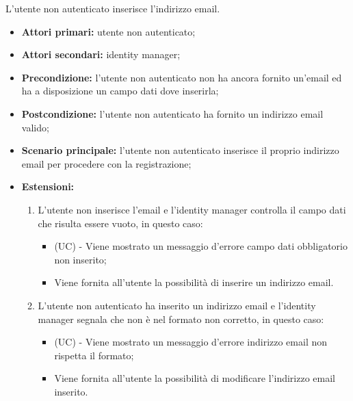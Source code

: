 L'utente non autenticato inserisce l'indirizzo email.
\begin{itemize}
	\item \textbf{Attori primari:} utente non autenticato;
	\item \textbf{Attori secondari:} identity manager;
	\item \textbf{Precondizione:} l'utente non autenticato non ha ancora fornito un'email ed ha a disposizione un campo dati dove inserirla;
	\item \textbf{Postcondizione:} l'utente non autenticato ha fornito un indirizzo email valido;
	\item \textbf{Scenario principale:} l'utente non autenticato inserisce il proprio indirizzo email per procedere con la registrazione;
	\item \textbf{Estensioni:}
	\begin{enumerate}[label=\lett]
		\item L'utente non inserisce l'email e l'identity manager controlla il campo dati che risulta essere vuoto, in questo caso:
		\begin{itemize}
			\item (UC) - Viene mostrato un messaggio d'errore campo dati obbligatorio non inserito;
			\item Viene fornita all'utente la possibilità di inserire un indirizzo email.
		\end{itemize}
		\item L'utente non autenticato ha inserito un indirizzo email e l'identity manager segnala che non è nel formato non corretto, in questo caso:
		\begin{itemize}
			\item (UC) - Viene mostrato un messaggio d'errore indirizzo email non rispetta il formato;
			\item Viene fornita all'utente la possibilità di modificare l'indirizzo email inserito.
		\end{itemize}
	\end{enumerate}
\end{itemize}

